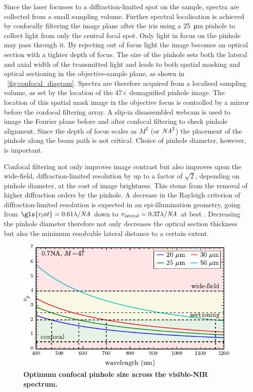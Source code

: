 \documentclass{article}
\begin{document}
Since the laser focusses to a diffraction-limited spot on the sample, spectra are collected from a small sampling volume. Further spectral localisation is achieved by confocally filtering the image plane after the iris using a \SI{25}{\micro\metre} pinhole to collect light from only the central focal spot. Only light in focus on the pinhole may pass through it. By rejecting out of focus light the image becomes an optical section with a tighter depth of focus. The size of the pinhole sets both the lateral and axial width of the transmitted light and leads to both spatial masking and optical sectioning in the objective-sample plane, as shown in \figurename~\ref{fig:confocal_diagram}. Spectra are therefore acquired from a localised sampling volume, as set by the location of the 47$\times$ demagnified pinhole image. The location of this spatial mask image in the objective focus is controlled by a mirror before the confocal filtering array. A slip-in disassembled webcam is used to image the Fourier plane before and after confocal filtering to check pinhole alignment. Since the depth of focus scales as $M^2$ (or $\mathit{NA}^2$) the placement of the pinhole along the beam path is not critical. Choice of pinhole diameter, however, is important.

Confocal filtering not only improves image contrast but also improves upon the wide-field, diffraction-limited resolution by up to a factor of $\sqrt{2}$, depending on pinhole diameter, at the cost of image brightness. This stems from the removal of higher diffraction orders by the pinhole. A decrease in the Rayleigh criterion \cite{born1999principles} of diffraction-limited resolution is expected in an epi-illumination geometry, going from $\gls{r_lat}=0.61\lambda/\NA$ down to $r_{\mathrm{lateral}}=0.37\lambda/\mathit{NA}$ at best \cite{}.
Decreasing the pinhole diameter therefore not only decreases the optical section thickness but also the minimum resolvable lateral distance to a certain extent.

\begin{figure}[bt]
\centering
\includegraphics{figures/confocal_pinhole_choice}
\caption[Optimum confocal pinhole size across the visible-NIR spectrum]{\textbf{Optimum confocal pinhole size across the visible-NIR spectrum.}}
\label{fig:confocal_pinhole_choice}
\end{figure}
\end{document}
